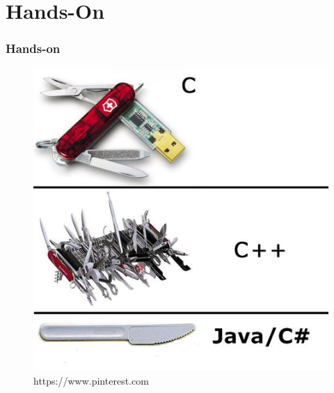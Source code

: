 \section{Hands-On}

\begin{frame}[fragile]
	\frametitle{Hands-on}
	\begin{figure}
		\includegraphics[width=0.6\linewidth]{img/hands_on.jpg}
		\caption{https://www.pinterest.com}
	\end{figure}%
\end{frame}
